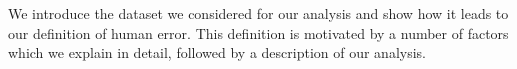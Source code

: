 \documentclass{article}
\theoremstyle{plain}
\theoremstyle{definition}
\theoremstyle{remark}
\begin{document}


We introduce the dataset we considered for our analysis and show how it leads to our definition of human error. This definition is motivated by a number of factors which we explain in detail, followed by a description of our analysis.

\end{document}
